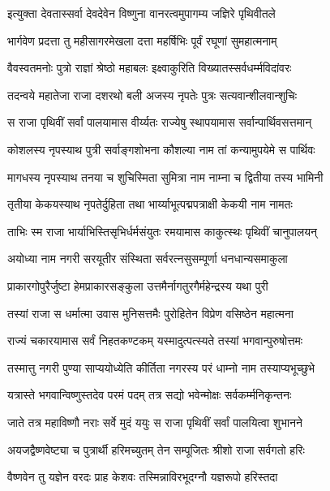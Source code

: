 
\twolineshloka
{इत्युक्ता देवतास्सर्वा देवदेवेन विष्णुना}
{वानरत्वमुपागम्य जज्ञिरे पृथिवीतले}%

\twolineshloka
{भार्गवेण प्रदत्ता तु महीसागरमेखला}
{दत्ता महर्षिभिः पूर्वं रघूणां सुमहात्मनाम्}%

\twolineshloka
{वैवस्वतमनोः पुत्रो राज्ञां श्रेष्ठो महाबलः}
{इक्ष्वाकुरिति विख्यातस्सर्वधर्म्मविदांवरः}%

\twolineshloka
{तदन्वये महातेजा राजा दशरथो बली}
{अजस्य नृपतेः पुत्रः सत्यवान्शीलवान्शुचिः}%

\twolineshloka
{स राजा पृथिवीं सर्वां पालयामास वीर्य्यतः}
{राज्येषु स्थापयामास सर्वान्पार्थिवसत्तमान्}%

\twolineshloka
{कोशलस्य नृपस्याथ पुत्री सर्वाङ्गशोभना}
{कौशल्या नाम तां कन्यामुपयेमे स पार्थिवः}%

\twolineshloka
{मागधस्य नृपस्याथ तनया च शुचिस्मिता}
{सुमित्रा नाम नाम्ना च द्वितीया तस्य भामिनी}%

\twolineshloka
{तृतीया केकयस्याथ नृपतेर्दुहिता तथा}
{भार्य्याभूत्पद्मपत्राक्षी केकयी नाम नामतः}%

\twolineshloka
{ताभिः स्म राजा भार्याभिस्तिसृभिर्धर्मसंयुतः}
{रमयामास काकुत्स्थः पृथिवीं चानुपालयन्}%

\twolineshloka
{अयोध्या नाम नगरी सरयूतीर संस्थिता}
{सर्वरत्नसुसम्पूर्णा धनधान्यसमाकुला}%

\twolineshloka
{प्राकारगोपुरैर्जुष्टा हेमप्राकारसङ्कुला}
{उत्तमैर्नागतुरगैर्महेन्द्रस्य यथा पुरी}%

\twolineshloka
{तस्यां राजा स धर्मात्मा उवास मुनिसत्तमैः}
{पुरोहितेन विप्रेण वसिष्ठेन महात्मना}%

\twolineshloka
{राज्यं चकारयामास सर्वं निहतकण्टकम्}
{यस्मादुत्पत्स्यते तस्यां भगवान्पुरुषोत्तमः}%

\twolineshloka
{तस्मात्तु नगरी पुण्या साप्ययोध्येति कीर्तिता}
{नगरस्य परं धाम्नो नाम तस्याप्यभूच्छुभे}%

\twolineshloka
{यत्रास्ते भगवान्विष्णुस्तदेव परमं पदम्}
{तत्र सद्यो भवेन्मोक्षः सर्वकर्म्मनिकृन्तनः}%

\twolineshloka
{जाते तत्र महाविष्णौ नराः सर्वे मुदं ययुः}
{स राजा पृथिवीं सर्वां पालयित्वा शुभानने}%

\twolineshloka
{अयजद्वैष्णवेष्ट्या च पुत्रार्थी हरिमच्युतम्}
{तेन सम्पूजितः श्रीशो राजा सर्वगतो हरिः}%

\twolineshloka
{वैष्णवेन तु यज्ञेन वरदः प्राह केशवः}
{तस्मिन्नाविरभूदग्नौ यज्ञरूपो हरिस्तदा}%

